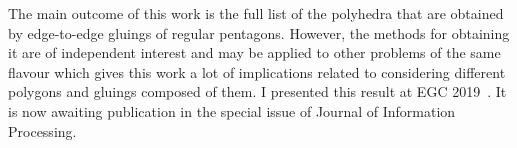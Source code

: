 \documentclass[a4paper,11pt]{article}
\theoremstyle{definition}
\begin{document}
The main outcome of this work is the full list of the polyhedra that are obtained by edge-to-edge gluings of regular pentagons. However, the methods for obtaining it are of independent interest and may be applied to other problems of the same flavour which gives this work a lot of implications related to considering different polygons and gluings composed of them. I presented this result at EGC 2019~\cite{egc-penta}. It is now awaiting publication in the special issue of Journal of Information Processing.



\end{document}
